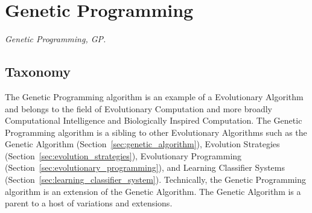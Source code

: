 

\section{Genetic Programming} 
\label{sec:genetic_programming}

\emph{Genetic Programming, GP.}

\subsection{Taxonomy}
The Genetic Programming algorithm is an example of a Evolutionary Algorithm and belongs to the field of Evolutionary Computation and more broadly Computational Intelligence and Biologically Inspired Computation. 
The Genetic Programming algorithm is a sibling to other Evolutionary Algorithms such as the Genetic Algorithm (Section~\ref{sec:genetic_algorithm}), Evolution Strategies (Section~\ref{sec:evolution_strategies}), Evolutionary Programming (Section~\ref{sec:evolutionary_programming}), and Learning Classifier Systems (Section~\ref{sec:learning_classifier_system}). Technically, the Genetic Programming algorithm is an extension of the Genetic Algorithm. The Genetic Algorithm is a parent to a host of variations and extensions.

